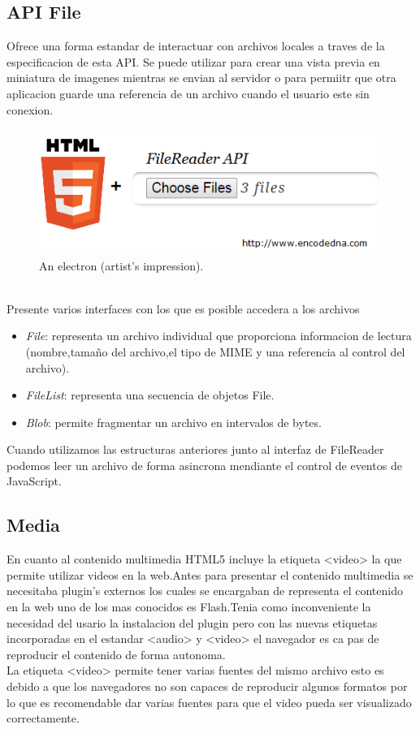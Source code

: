 \subsection{API File}
Ofrece una forma estandar de interactuar  con archivos locales  a traves de la especificacion de esta API. Se puede utilizar para crear una vista previa en miniatura de imagenes mientras se envian al servidor o para permiitr que otra aplicacion guarde una referencia de un archivo cuando el usuario este sin conexion.
\begin{figure}[!h]
\begin{center}
    \includegraphics[width=0.6\linewidth]{Figures/fileReader}
	\decoRule
	\caption[An Electron]{An electron (artist's impression).}
\label{fig:canvas}
\end{center}
\end{figure}
\\Presente varios interfaces con los que es posible accedera a los archivos 
\begin{itemize}
\item \textit{File}: representa un archivo individual que proporciona informacion de lectura (nombre,tamaño del archivo,el tipo de MIME y una referencia al control del archivo).
\item \textit{FileList}: representa una secuencia de objetos File.
\item \textit{Blob}: permite fragmentar un archivo en intervalos de bytes.
\end{itemize}
 Cuando utilizamos las estructuras anteriores junto al interfaz de FileReader podemos leer un archivo de forma asincrona mendiante el control de eventos de JavaScript.
\subsection{Media }
En cuanto al contenido multimedia HTML5 incluye  la etiqueta <video>  la que permite utilizar videos en la web.Antes para presentar el contenido multimedia se necesitaba  plugin's externos los cuales se encargaban de representa el contenido en la web uno de los mas conocidos es Flash.Tenia como inconveniente la necesidad del usario la instalacion del plugin pero con las nuevas etiquetas incorporadas en el estandar <audio> y <video> el navegador es ca
pas de reproducir el contenido de forma autonoma. 
\\La etiqueta <video>  permite tener varias fuentes del mismo archivo esto es debido a que los navegadores no son capaces de reproducir algunos formatos por lo que es recomendable dar varias fuentes para que el video pueda ser visualizado correctamente.
